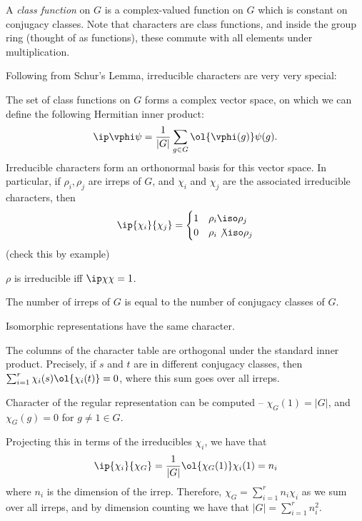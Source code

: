 \documentclass[12pt]{article}
\begin{document}
\begin{definition*}
  A \emph{class function} on $G$ is a complex-valued function on $G$ which is
  constant on conjugacy classes. Note that characters are class functions, and
  inside the group ring (thought of as functions), these commute with all
  elements under multiplication.  
\end{definition*}

Following from Schur's Lemma, irreducible characters are very very special: 
\begin{theorem*}
  The set of class functions on $G$ forms a complex vector space, on which we
  can define the following Hermitian inner product:
  \[
    \ip \vphi \psi = \frac{1}{|G|} \sum_{g \in G} \ol{\vphi(g)} \psi(g). 
  \] 
  Irreducible characters form an orthonormal basis for this vector space. 
  In particular, if $\rho_i, \rho_j$ are irreps of $G$, and $\chi_i$ and $\chi_j$
  are the associated irreducible characters, then 
  \[
    \ip {\chi_i}{\chi_j} = \begin{cases}
      1 & \rho_i \iso \rho_j \\ 0 & \rho_i \not\iso \rho_j
    \end{cases}
  \]
  (check this by example)
\end{theorem*}

\begin{corollary*}
  $\rho$ is irreducible iff $\ip \chi \chi = 1$. 
\end{corollary*}

\begin{corollary*}
  The number of irreps of $G$ is equal to the number of conjugacy classes of
  $G$. 
\end{corollary*}

\begin{corollary*}
  Isomorphic representations have the same character.
\end{corollary*}

\begin{corollary*}
  The columns of the character table are orthogonal under the standard inner
  product. Precisely, if $s$ and $t$ are in different conjugacy classes, then
  $\sum_{i=1}^r \chi_i(s) \ol{\chi_i(t)} = 0$, where this sum goes over all
  irreps.  
\end{corollary*}

\begin{example*}
  Character of the regular representation can be computed -- $\chi_G(1) = |G|$,
  and $\chi_G(g) = 0$ for $g \neq 1 \in G$.

  Projecting this in terms of the irreducibles $\chi_i$, we have that 
  \[
    \ip {\chi_i}{\chi_G} = \frac{1}{|G|} \ol{\chi_G(1)} \chi_i(1) = n_i
  \] 
  where $n_i$ is the dimension of the irrep. Therefore, $\chi_G = \sum_{i=1}^r
  n_i \chi_i$ as we sum over all irreps, and by dimension counting we have that
  $|G| = \sum_{i=1}^r n_i^2$. 
\end{example*}
\end{document}
